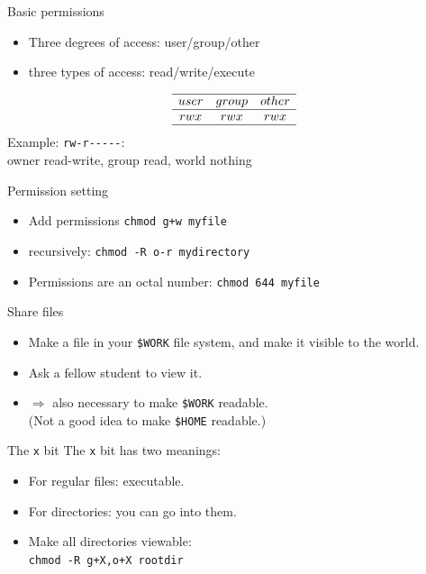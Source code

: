 \documentclass[11pt,headernav]{beamer}
\begin{document}
\begin{numberedframe}{Basic permissions}
  \label{sl-lnx:rwx}
  \begin{itemize}
  \item Three degrees of access: user/group/other
  \item three types of access: read/write/execute
  \end{itemize}
  \[ \begin{array}{ccc}
    \hline user&group&other\\ \hline rwx&rwx&rwx \\ \hline
  \end{array}
  \]
  Example: \lstinline{rw-r-----}:\\
  owner read-write, group read, world nothing
\end{numberedframe}

\begin{numberedframe}{Permission setting}
  \label{sl-lnx:755}
  \begin{itemize}
  \item Add permissions \lstinline{chmod g+w myfile}
  \item recursively: \lstinline{chmod -R o-r mydirectory}
  \item Permissions are an octal number:
    \lstinline{chmod 644 myfile}
  \end{itemize}
\end{numberedframe}


\begin{numberedframe}{Share files}
  \label{sl-lnx:share}
  \begin{itemize}
  \item Make a file in your \lstinline{$WORK} file system,
    and make it visible to the world.
  \item Ask a fellow student to view it.
  \item $\Rightarrow$ also necessary to make \lstinline{$WORK} readable.\\
    (Not a good idea to make \lstinline{$HOME} readable.)
  \end{itemize}
\end{numberedframe}

\begin{numberedframe}{The \texttt{x} bit}
  \label{sl-lnx:x}
  The \lstinline{x} bit has two meanings:
  \begin{itemize}
  \item For regular files: executable.
  \item For directories: you can go into them.
  \item Make all directories viewable:\\
    \lstinline{chmod -R g+X,o+X rootdir}
  \end{itemize}
\end{numberedframe}
\end{document}
